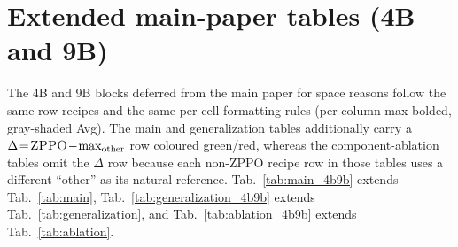 \section{Extended main-paper tables (4B and 9B)}
\label{sec:appendix:main_tables}

The 4B and 9B blocks deferred from the main paper for space reasons follow the same row recipes and the same per-cell formatting rules (per-column max bolded, gray-shaded Avg). The main and generalization tables additionally carry a $\Delta\!=\!\textsc{ZPPO}\!-\!\max\nolimits_{\text{other}}$ row coloured green/red, whereas the component-ablation tables omit the $\Delta$ row because each non-ZPPO recipe row in those tables uses a different ``other'' as its natural reference. Tab.~\ref{tab:main_4b9b} extends Tab.~\ref{tab:main}, Tab.~\ref{tab:generalization_4b9b} extends Tab.~\ref{tab:generalization}, and Tab.~\ref{tab:ablation_4b9b} extends Tab.~\ref{tab:ablation}.






